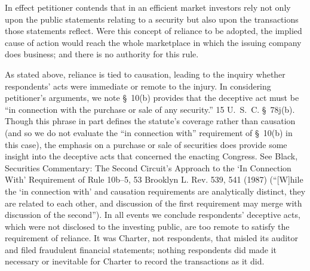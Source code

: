   In effect petitioner contends that in an efficient market investors rely not only upon the public statements relating to a security but also upon the transactions those statements reflect. Were this concept of reliance to be adopted, the implied cause of action would reach the whole marketplace in which the issuing company does business; and there is no authority for this rule.

  As stated above, reliance is tied to causation, leading to the inquiry whether respondents' acts were immediate or remote to the injury. In considering petitioner's arguments, we note \S~10(b) provides that the deceptive act must be ``in connection with the purchase or sale of any security.'' 15 U.~S.~C. \S~78j(b). Though this phrase in part defines the statute's coverage rather than causation (and so we do not evaluate the ``in connection with'' requirement of \S~10(b) in this case), the emphasis on a purchase or sale of securities does provide some insight into the deceptive acts that concerned the enacting Congress. See Black, Securities Commentary: \newpage  The Second Circuit's Approach to the ‘In Connection With' Requirement of Rule 10b--5, 53 Brooklyn L. Rev. 539, 541 (1987) (``[W]hile the ‘in connection with' and causation requirements are analytically distinct, they are related to each other, and discussion of the first requirement may merge with discussion of the second''). In all events we conclude respondents' deceptive acts, which were not disclosed to the investing public, are too remote to satisfy the requirement of reliance. It was Charter, not respondents, that misled its auditor and filed fraudulent financial statements; nothing respondents did made it necessary or inevitable for Charter to record the transactions as it did.

